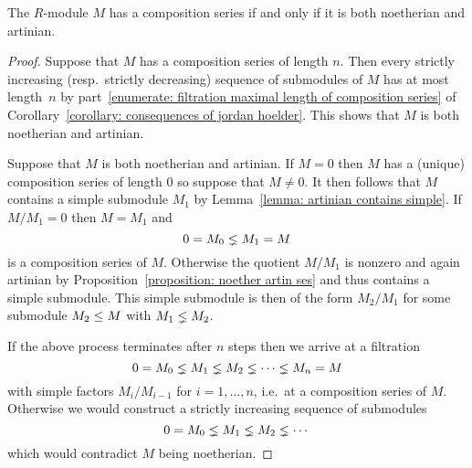 \begin{proposition}
  The $R$-module $M$ has a composition series if and only if it is both noetherian and artinian.
\end{proposition}


\begin{proof}
  Suppose that $M$ has a composition series of length $n$.
  Then every strictly increasing (resp.\ strictly decreasing) sequence of submodules of $M$ has at most length~$n$ by part~\ref*{enumerate: filtration maximal length of composition series} of Corollary~\ref{corollary: consequences of jordan hoelder}.
  This shows that $M$ is both noetherian and artinian.
  
  Suppose that $M$ is both noetherian and artinian.
  If $M = 0$ then $M$ has a (unique) composition series of length $0$ so suppose that $M \neq 0$.
  It then follows that $M$ contains a simple submodule $M_1$ by Lemma~\ref{lemma: artinian contains simple}.
  If $M/M_1 = 0$ then $M = M_1$ and
  \[
                0
    =           M_0
    \lneq M_1
    =           M
    \]
  is a composition series of $M$.
  Otherwise the quotient $M/M_1$ is nonzero and again artinian by Proposition~\ref{proposition: noether artin ses} and thus contains a simple submodule.
  This simple submodule is then of the form $M_2/M_1$ for some submodule $M_2 \leq M$ with $M_1 \lneq M_2$.
  
  If the above process terminates after $n$ steps then we arrive at a filtration
  \[
                0
    =           M_0
    \lneq M_1
    \lneq M_2
    \lneq \dotsb
    \lneq M_n
    =           M
  \]
  with simple factors $M_i/M_{i-1}$ for $i = 1, \dotsc, n$, i.e.\ at a composition series of $M$.
  Otherwise we would construct a strictly increasing sequence of submodules
  \[
                 0
    =            M_0
    \lneq  M_1
    \lneq  M_2
    \lneq  \dotsb
  \]
  which would contradict $M$ being noetherian.
\end{proof}





